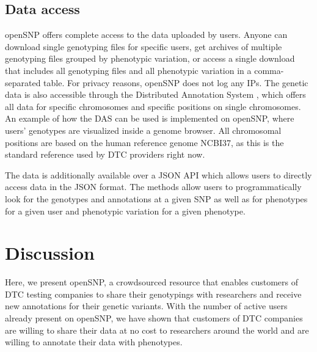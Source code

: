 \documentclass[10pt]{article}
\begin{document}
\subsection*{Data access}
openSNP offers complete access to the data uploaded by users. Anyone can download single genotyping files for specific users, get archives of multiple genotyping files 
grouped by phenotypic variation, or access a single download that includes all genotyping files and all phenotypic variation in a comma-separated table. For privacy reasons, openSNP does not log any IPs. The genetic data is also 
accessible through the Distributed Annotation System \cite{Dowell2001,Jenkinson2008}, which offers all data for specific chromosomes and specific positions on single chromosomes. 
An example of how the DAS can be used is implemented on openSNP, where users' genotypes are visualized inside a genome browser. All chromosomal positions are based on the human reference genome NCBI37, as this is the standard reference used by DTC providers right now.

The data is additionally available over a JSON API which allows users to directly access data in the JSON format. The methods allow users to programmatically look for the genotypes and annotations at a given SNP as well as for phenotypes for a given user and phenotypic variation for a given phenotype.

\section*{Discussion}

%
%
Here, we present openSNP, a crowdsourced resource that enables customers of DTC testing companies to share their genotypings with researchers and receive new annotations for their genetic variants. With the number of active users already present on openSNP, we have shown that customers of DTC companies are willing to share their data at no cost to researchers around the world and are willing to annotate their data with phenotypes.
\end{document}
